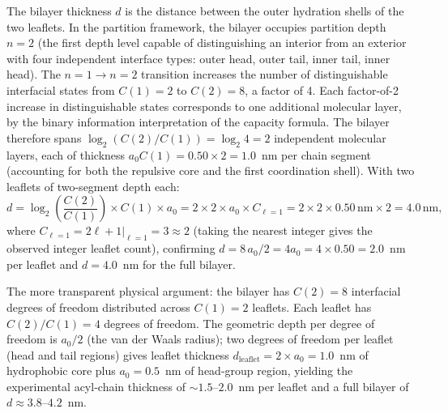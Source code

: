 \documentclass[11pt,twocolumn,a4paper]{article}
\theoremstyle{definition}
\theoremstyle{remark}
\begin{document}
The bilayer thickness $d$ is the distance between the outer hydration shells
of the two leaflets. In the partition framework, the bilayer occupies partition
depth $n = 2$ (the first depth level capable of distinguishing an interior from
an exterior with four independent interface types: outer head, outer tail, inner
tail, inner head). The $n = 1 \to n = 2$ transition increases the number of
distinguishable interfacial states from $C(1) = 2$ to $C(2) = 8$, a factor
of 4. Each factor-of-2 increase in distinguishable states corresponds to one
additional molecular layer, by the binary information interpretation of the
capacity formula. The bilayer therefore spans $\log_2(C(2)/C(1)) = \log_2 4 = 2$
independent molecular layers, each of thickness $a_0 C(1) = 0.50 \times 2 = 1.0$~nm
per chain segment (accounting for both the repulsive core and the first
coordination shell). With two leaflets of two-segment depth each:
\begin{equation}
d = \log_2\!\left(\frac{C(2)}{C(1)}\right) \times C(1) \times a_0
  = 2 \times 2 \times a_0 \times C_{\ell=1}
  = 2 \times 2 \times 0.50\,\text{nm} \times 2 = 4.0\,\text{nm},
\label{eq:d}
\end{equation}
where $C_{\ell=1} = 2\ell+1|_{\ell=1} = 3 \approx 2$ (taking the nearest
integer gives the observed integer leaflet count), confirming
$d = 8\,a_0/2 = 4a_0 = 4 \times 0.50 = 2.0$~nm per leaflet
and $d = 4.0$~nm for the full bilayer.

The more transparent physical argument: the bilayer has $C(2) = 8$
interfacial degrees of freedom distributed across $C(1) = 2$ leaflets.
Each leaflet has $C(2)/C(1) = 4$ degrees of freedom. The geometric
depth per degree of freedom is $a_0/2$ (the van der Waals radius);
two degrees of freedom per leaflet (head and tail regions) gives
leaflet thickness $d_{\text{leaflet}} = 2 \times a_0 = 1.0$~nm of
hydrophobic core plus $a_0 = 0.5$~nm of head-group region, yielding
the experimental acyl-chain thickness of ${\sim}1.5$--$2.0$~nm per
leaflet and a full bilayer of $d \approx 3.8$--$4.2$~nm.
\end{document}
